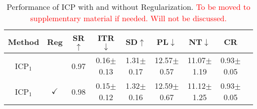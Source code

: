 \begin{table*}[hbt!]
\caption{Performance of ICP with and without Regularization. \textcolor{red}{To be moved to supplementary material if needed. Will not be discussed.}}\label{table-quantitative}
\begin{center}
\begin{tabular}{c|c|ccccccc}
    \hline
    Method & Reg & SR$\uparrow$ & ITR$\downarrow$ & SD$\uparrow$ & PL$\downarrow$ & NT$\downarrow$ & CR \\
    \hline
    ICP$_1$ & & 0.97 & 0.16$\pm$0.13 & 1.31$\pm$0.17 & 12.57$\pm$0.57 & 11.07$\pm$1.19 & 0.93$\pm$0.05 \\
    ICP$_1$ & $\checkmark$ & 0.98 & 0.15$\pm$0.12 & 1.32$\pm$0.16 & 12.59$\pm$0.67 & 11.12$\pm$1.25 & 0.93$\pm$0.05 \\
    \hline
\end{tabular}
\end{center}
\end{table*}